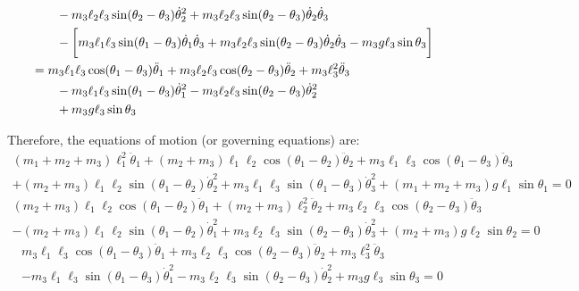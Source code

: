 \documentclass[letterpaper,8pt]{article}
\begin{document}
\begin{align*}
& \qquad    - m_3 \ell_2 \ell_3 \sin (\theta_2 - \theta_3) \dot{\theta}_2^2 + m_3 \ell_2 \ell_3 \sin (\theta_2 - \theta_3) \dot{\theta}_2 \dot{\theta}_3 \\
& \qquad  - \left[ \vphantom{\frac{1}{2}} 
              m_3 \ell_1 \ell_3 \sin (\theta_1 - \theta_3) \dot{\theta}_1 \dot{\theta}_3
            + m_3 \ell_2 \ell_3 \sin (\theta_2 - \theta_3) \dot{\theta}_2 \dot{\theta}_3 
            - m_3 g \ell_3 \sin \theta_3  \right] \\
           &= m_3 \ell_1 \ell_3 \cos (\theta_1 - \theta_3) \ddot{\theta}_1 + m_3 \ell_2 \ell_3 \cos (\theta_2 - \theta_3) \ddot{\theta}_2 + m_3 \ell_3^2 \ddot{\theta}_3 \\
& \qquad    - m_3 \ell_1 \ell_3 \sin (\theta_1 - \theta_3) \dot{\theta}_1^2 - m_3 \ell_2 \ell_3 \sin (\theta_2 - \theta_3) \dot{\theta}_2^2  \\
& \qquad    + m_3 g \ell_3 \sin \theta_3  \\
\end{align*}


Therefore, the equations of motion (or governing equations) are:
\begin{multline*}
(m_1 + m_2 + m_3)\ell_1^2 \ddot{\theta}_1 + (m_2 + m_3)\ell_1\ell_2 \cos(\theta_1 - \theta_2)\ddot{\theta}_2 + m_3 \ell_1 \ell_3 \cos (\theta_1 - \theta_3)\ddot{\theta}_3  \\
    + (m_2 + m_3)\ell_1\ell_2 \sin(\theta_1 - \theta_2)\dot{\theta}_2^2 + m_3 \ell_1 \ell_3 \sin (\theta_1 - \theta_3)\dot{\theta}_3^2 + (m_1 + m_2 + m_3) g \ell_1 \sin \theta_1 = 0 
\end{multline*}
\begin{multline*}
(m_2 + m_3) \ell_1 \ell_2 \cos (\theta_1 - \theta_2) \ddot{\theta}_1 + (m_2 + m_3) \ell_2^2 \ddot{\theta}_2 + m_3 \ell_2 \ell_3 \cos (\theta_2 - \theta_3) \ddot{\theta}_3  \\
    - (m_2 + m_3) \ell_1 \ell_2 \sin (\theta_1 - \theta_2) \dot{\theta}_1^2 + m_3 \ell_2 \ell_3 \sin (\theta_2 - \theta_3) \dot{\theta}_3^2 + (m_2 + m_3) g \ell_2 \sin \theta_2 = 0 
\end{multline*}
\begin{multline*}
m_3 \ell_1 \ell_3 \cos (\theta_1 - \theta_3) \ddot{\theta}_1 + m_3 \ell_2 \ell_3 \cos (\theta_2 - \theta_3) \ddot{\theta}_2 + m_3 \ell_3^2 \ddot{\theta}_3  \\
    - m_3 \ell_1 \ell_3 \sin (\theta_1 - \theta_3) \dot{\theta}_1^2 - m_3 \ell_2 \ell_3 \sin (\theta_2 - \theta_3) \dot{\theta}_2^2 + m_3 g \ell_3 \sin \theta_3 = 0 
\end{multline*}
\end{document}
